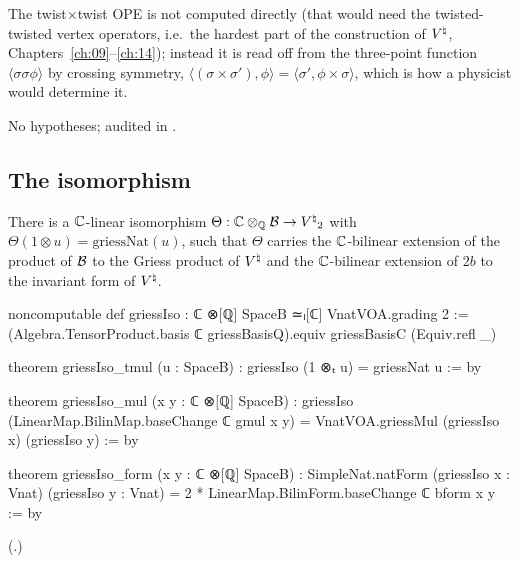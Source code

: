 \begin{physics}
The twist$\times$twist OPE is not computed directly (that would need the twisted-twisted vertex
operators, i.e.\ the hardest part of the construction of ${V^{\natural}}$, Chapters~\ref{ch:09}--\ref{ch:14});
instead it is read off from the three-point function $\langle\sigma\sigma\phi\rangle$ by crossing
symmetry, $\langle(\sigma\times\sigma'),\phi\rangle=\langle\sigma',\phi\times\sigma\rangle$, which is
how a physicist would determine it.
\end{physics}
\begin{status}
No hypotheses; audited in .
\end{status}

\subsection{The isomorphism}

\begin{theorem}\label{ch21:thm:griessIso}
There is a ${\mathbb{C}}$-linear isomorphism $\Theta:{\mathbb{C}}\otimes_{\mathbb{Q}}\mathcal{B}\to{V^{\natural}}_2$ with
$\Theta(1\otimes u)=\mathrm{griessNat}(u)$, such that $\Theta$ carries the ${\mathbb{C}}$-bilinear extension of the
product of $\mathcal{B}$ to the Griess product of ${V^{\natural}}$ and the ${\mathbb{C}}$-bilinear extension of $2b$ to the
invariant form of ${V^{\natural}}$.
\end{theorem}
\begin{leancode}
noncomputable def griessIso : ℂ ⊗[ℚ] SpaceB ≃ₗ[ℂ] VnatVOA.grading 2 :=
  (Algebra.TensorProduct.basis ℂ griessBasisQ).equiv griessBasisC (Equiv.refl _)
\end{leancode}
\begin{leancode}
theorem griessIso_tmul (u : SpaceB) : griessIso (1 ⊗ₜ u) = griessNat u := by
\end{leancode}
\begin{leancode}
theorem griessIso_mul (x y : ℂ ⊗[ℚ] SpaceB) :
    griessIso (LinearMap.BilinMap.baseChange ℂ gmul x y)
      = VnatVOA.griessMul (griessIso x) (griessIso y) := by
\end{leancode}
\begin{leancode}
theorem griessIso_form (x y : ℂ ⊗[ℚ] SpaceB) :
    SimpleNat.natForm (griessIso x : Vnat) (griessIso y : Vnat)
      = 2 * LinearMap.BilinForm.baseChange ℂ bform x y := by
\end{leancode}
(.)

